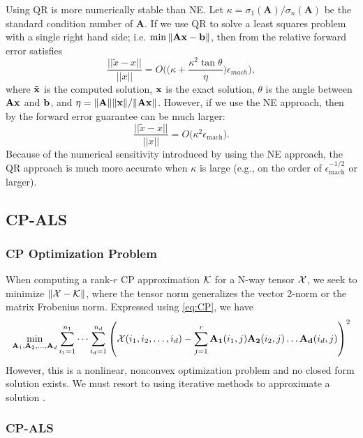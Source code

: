 \documentclass{article}
\newcommand{\mat}[1]{\mathbf{#1}}
\newcommand{\V}[2][]{\bm{#1{\mathbf{\MakeLowercase{#2}}}}} 		%
\newcommand{\T}[2][]{#1{\mathbf{\cal{#2}}}} 						%
\begin{document}
Using QR is more numerically stable than NE. 
Let $\kappa = \sigma_1(\mat{A})/\sigma_n(\mat{A})$ be the standard condition number of $\mat{A}$.
If we use QR to solve a least squares problem with a single right hand side; i.e. $\min\|\mat{A}\V{x} - \V{b} \|$, then from \cite[Eq. (19.2)]{trefethen1997numerical} the relative forward error satisfies
\begin{equation}
  \frac{||\tilde{x} - x||}{||x||} = O \biggl(\biggl(\kappa + \frac{\kappa^2\tan\theta}{\eta}\biggr)\epsilon_{mach}\biggr),
\end{equation}
where $\V[\tilde]{x}$ is the computed solution, $\V{x}$ is the exact solution, $\theta$ is the angle between $\mat{A}\V{x}$ and $\V{b}$, and $\eta = \|\mat{A}\|\|\V{x}\|/\|\mat{A}\V{x}\|$.
However, if we use the NE approach, then by \cite[Eq. (19.3)]{trefethen1997numerical} the forward error guarantee can be much larger: 
\begin{equation}
  \frac{||\tilde{x} - x||}{||x||} = O \biggl(\kappa^2 \epsilon_{\text{mach}}\biggr).
\end{equation}
Because of the numerical sensitivity introduced by using the NE approach, the QR approach is much more accurate when $\kappa$ is large (e.g., on the order of $
\epsilon_{\text{mach}}^{-1/2}$ or larger).


\subsection{CP-ALS}

\subsubsection{CP Optimization Problem}

When computing a rank-$r$ CP approximation $\T{K}$ for a N-way tensor $\T{X}$, we seek to minimize $\| \T{X} - \T{K} \|$, where the tensor norm generalizes the vector 2-norm or the matrix Frobenius norm.
Expressed using \cref{eq:CP}, we have  
$$\min_{\mat{A}_1,\mat{A}_2, \dots,\mat{A}_d} \sum_{i_1=1}^{n_1} \cdots \sum_{i_d=1}^{n_d} \left(\T{X}(i_1,i_2,\dots, i_d) - \sum^{r}_{j=1} \mat{A_1}(i_1,j)\mat{A_2}(i_2,j) \dots \mat{A_d}(i_d,j) \right)^2 $$
However, this is a nonlinear, nonconvex optimization problem and no closed form solution exists. 
We must resort to using iterative methods to approximate a solution \cite{kolda2009tensor}.

\subsubsection{CP-ALS}
\end{document}
